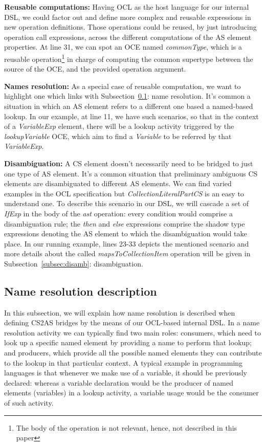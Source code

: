 \documentclass{llncs}
\begin{document}
\textbf{Reusable computations:} Having OCL as the  host language for our internal DSL, we could factor out and define more complex and reusable expressions in new operation definitions. Those operations could be reused, by just introducing operation call expressions, across the different computations of the AS element properties. At line 31, we can spot an OCE named \emph{commonType}, which is a reusable operation\footnote{The body of the operation is not relevant, hence, not described in this paper} in charge of computing the common supertype between the source of the OCE, and the provided operation argument.

\textbf{Names resolution:} As a special case of reusable computation, we want to highlight one which links with Subsection~\ref{subsec:nameReso}: name resolution. It's common a situation in which an AS element refers to a different one based a named-based lookup. In our example, at line 11, we have such scenarios, so that in the context of a \emph{VariableExp} element, there will be a lookup activity triggered by the \emph{lookupVariable} OCE, which aim to find a \emph{Variable} to be referred by that \emph{VariableExp}.


\textbf{Disambiguation:} A CS element doesn't necessarily need to be bridged to just one type of AS element. It's a common situation that preliminary ambiguous CS elements are disambiguated to different AS elements. We can find varied examples in the OCL specification but \emph{CollectionLiteralPartCS} is an easy to understand one. To describe this scenario in our DSL, we will cascade a set of \emph{IfExp} in the body of the \emph{ast} operation: every condition would comprise a disambiguation rule; the \emph{then} and \emph{else} expressions comprise the shadow type expressions denoting the AS element to which the disambiguation would take place. In our running example, lines 23-33 depicts the mentioned scenario and more details about the called \emph{mapsToCollectionItem} operation will be given in Subsection~\ref{subsec:disamb}: disambiguation.

\subsection{Name resolution description}
\label{subsec:nameReso}
In this subsection, we will explain how name resolution is described when defining CS2AS bridges by the means of our OCL-based internal DSL. In a name resolution activity we can typically find two main roles: consumers, which need to look up a specific named element by providing a name to perform that lookup; and producers, which provide all the possible named elements they can contribute to the lookup in that particular context. A typical example in programming languages is that whenever we make use of a variable, it should be previously declared: whereas a variable declaration would be the producer of named elements (variables) in a lookup activity, a variable usage would be the consumer of such activity. 
\end{document}
